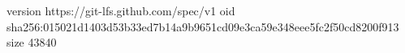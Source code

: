 version https://git-lfs.github.com/spec/v1
oid sha256:015021d1403d53b33ed7b14a9b9651cd09e3ca59e348eee5fc2f50cd8200f913
size 43840
